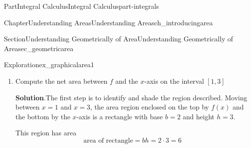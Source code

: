 \documentclass{tufte-book}
\newcommand{\blocktitlefont}{\relax}
\numberwithin{equation}{chapter}
\begin{document}
\begin{partptx}{Part}{Integral Calculus}{}{Integral Calculus}{}{}{part-integrals}
\begin{chapterptx}{Chapter}{Understanding Areas}{}{Understanding Areas}{}{}{ch_introducingarea}
\begin{sectionptx}{Section}{Understanding Geometrically of Area}{}{Understanding Geometrically of Area}{}{}{sec_geometricarea}
\begin{exploration}{Exploration}{}{ex_graphicalarea1}
\begin{enumerate}[font=\bfseries,label=(\alph*),ref=\alph*]
\begin{image}{0.25}{0.5}{0.25}{}
{\begin{tikzpicture}
\end{tikzpicture}
}%
\end{image}%
\item{}Compute the net area between \(f\) and the \(x\)-axis on the interval \([1,3]\)%
\par\smallskip%
\noindent\textbf{\blocktitlefont Solution}.\hypertarget{ex_graphicalarea1-3-2}{}\quad{}The first step is to identify and shade the region described. Moving between \(x=1\) and \(x=3\), the area region enclosed on the top by \(f(x)\) and the bottom by the \(x\)-axis is a rectangle with base \(b=2\) and height \(h=3\).%
\par
This region has area%
\begin{equation*}
\text{area of rectangle} = b h = 2 \cdot 3 = 6 
\end{equation*}
%
\begin{image}{0.25}{0.5}{0.25}{}%
\end{image}
\end{enumerate}
\end{exploration}
\end{sectionptx}
\end{chapterptx}
\end{partptx}
\end{document}
